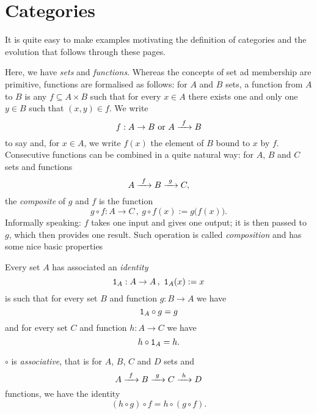 
\section{Categories}

It is quite easy to make examples motivating the definition of
categories and the evolution that follows through these pages.

\begin{example}
  Here, we have {\em sets} and {\em functions}. Whereas the concepts
  of set ad membership are primitive, functions are formalised as
  follows: for \(A\) and \(B\) sets, a function from \(A\) to \(B\) is
  any \(f \subseteq A \times B\) such that for every \(x \in A\) there
  exists one and only one \(y \in B\) such that \((x, y ) \in f\). We
  write
  \[f : A \to B \ \text{or} \ A \xrightarrow{\ f\ } B\] to say  and, for \(x \in A\), we write
  \(f(x)\) the element of \(B\) bound to \(x\) by \(f\). Consecutive
  functions can be combined in a quite natural way: for \(A\), \(B\)
  and \(C\) sets and functions
  \[A \xrightarrow{\ f\ } B \xrightarrow{\ g\ } C ,\] the {\em composite} of \(g\) and
  \(f\) is the function
  \[g \circ f : A \to C \,,\ g \circ f(x) := g\big(f(x)\big) .\]
  Informally speaking: \(f\) takes one input and gives one output; it
  is then passed to \(g\), which then provides one result. Such
  operation is called {\em composition} and has some nice basic
  properties
  \begin{tcbenum}
  \item Every set \(A\) has associated an {\em identity}
    \[\mathtt 1_A : A \to A \,,\ \mathtt 1_A (x) := x\]
    is such that for every set \(B\) and function \(g : B \to A\) we
    have
    \[\mathtt 1_A \circ g = g\]
    and for every set \(C\) and function \(h : A \to C\) we have
    \[h \circ \mathtt 1_A = h .\]
  \item \(\circ\) is {\em associative}, that is for \(A\), \(B\),
    \(C\) and \(D\) sets and
    \[A \xrightarrow{\ f\ } B \xrightarrow{\ g\ } C \xrightarrow{\ h\ } D\] functions, we have
    the identity
    \[(h \circ g) \circ f = h \circ (g \circ f) .\]
  \end{tcbenum}
\end{example}

